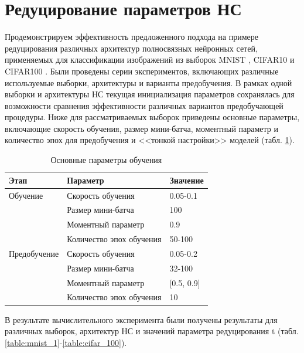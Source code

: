 
\section{Редуцирование параметров НС}

Продемонстрируем эффективность предложенного подхода на примере редуцирования различных архитектур полносвязных нейронных сетей, применяемых для классификации изображений из выборок MNIST \cite{mnist}, CIFAR10 и CIFAR100 \cite{krizhevsky2009learning}.
Были проведены серии экспериментов, включающих различные используемые выборки, архитектуры и варианты предобучения. В рамках одной выборки и архитектуры НС текущая инициализация параметров сохранялась для возможности сравнения эффективности различных вариантов предобучающей процедуры.
Ниже для рассматриваемых выборок приведены основные параметры, включающие скорость обучения, размер мини-батча, моментный параметр и количество эпох для предобучения и <<тонкой настройки>> моделей (табл. \ref{table:reduce_training_params}).

\begin{table} [!h]
  \small
  \caption{Основные параметры обучения}\label{table:reduce_training_params}
\centering
\begin{tabular}{| p{3cm} | p{6cm} | p{2cm} |}
  \hline
    \textbf{Этап} & \textbf{Параметр} & \textbf{Значение}\\
    \hline
    Обучение & Скорость обучения & 0.05-0.1\\
    \cline{2-3}
    & Размер мини-батча & 100 \\
    \cline{2-3}
    & Моментный параметр & 0.9 \\
    \cline{2-3}
    & Количество эпох обучения & 50-100\\
    \hline
    Предобучение & Скорость обучения & 0.05-0.2\\
    \cline{2-3}
    & Размер мини-батча & 32-100 \\
    \cline{2-3}
    & Моментный параметр & [0.5, 0.9] \\
    \cline{2-3}
    & Количество эпох обучения & 10\\
    \hline
\end{tabular}
\end{table}

В результате вычислительного эксперимента были получены результаты для различных выборок, архитектур НС и значений параметра редуцирования t (табл. \ref{table:mnist_1}-\ref{table:cifar_100}).

